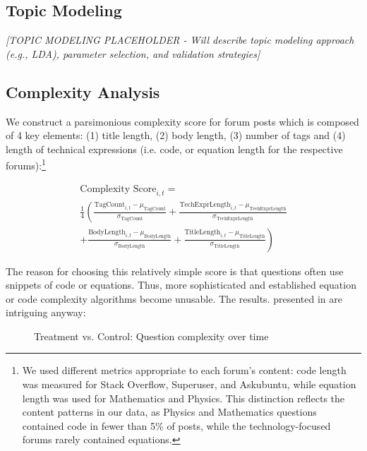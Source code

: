 
\subsection{Topic Modeling}
\textit{[TOPIC MODELING PLACEHOLDER - Will describe topic modeling approach (e.g., LDA), parameter selection, and validation strategies]}


\subsection{Complexity Analysis}

We construct a parsimonious complexity score for forum posts which is composed of 4 key elements: (1) title length, (2) body length, (3) number of tags and (4) length of technical expressions (i.e. code, or equation length for the respective forums):\footnote{We used different metrics appropriate to each forum's content: code length was measured for Stack Overflow, Superuser, and Askubuntu, while equation length was used for Mathematics and Physics. This distinction reflects the content patterns in our data, as Physics and Mathematics questions contained code in fewer than 5\% of posts, while the technology-focused forums rarely contained equations.}

\begin{multline}\label{eq:cscore}
    \text{Complexity Score}_{i,t} = \\ 
    \frac{1}{4} \left( \frac{\text{TagCount}_{i,t} - \mu_{\text{TagCount}}}{\sigma_{\text{TagCount}}} + \frac{\text{TechExprLength}_{i,t} - \mu_{\text{TechExprLength}}}{\sigma_{\text{TechExprLength}}} \right. \\
    \left. + \frac{\text{BodyLength}_{i,t} - \mu_{\text{BodyLength}}}{\sigma_{\text{BodyLength}}} + \frac{\text{TitleLength}_{i,t} - \mu_{\text{TitleLength}}}{\sigma_{\text{TitleLength}}} \right)
\end{multline}

The reason for choosing this relatively simple score is that questions often use snippets of code or equations. Thus, more sophisticated and established equation or code complexity algorithms become unusable. The results. presented in  are intriguing anyway:

\begin{figure}[H]
    \centering
    
    \caption{Treatment vs. Control: Question complexity over time}
    \label{fig:complex}
\end{figure}


